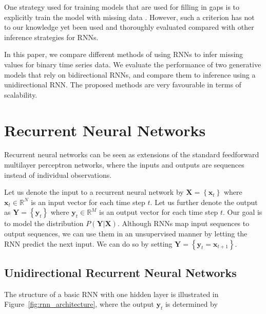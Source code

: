 \documentclass{article}
\begin{document}
One strategy used for training models that are used for filling in gaps is to 
explicitly train the model with missing data \citep[see e.g.][]{brakel2013training}.
However, such a criterion has not to our knowledge 
yet been used and thoroughly evaluated compared with other inference strategies 
for RNNs.

In this paper, we compare different methods of using RNNs to infer missing values 
for binary time series data. We evaluate the performance of two generative models that
rely on bidirectional RNNs, and compare them to inference using a unidirectional RNN.
The proposed methods are very favourable in terms of scalability.

\section{Recurrent Neural Networks}
\label{sec:rnns}

Recurrent neural networks \citep{rumelhart1986learning,haykin2009neural} can be seen as extensions of the standard feedforward 
multilayer perceptron networks, where the inputs and outputs are sequences 
instead of individual observations.

Let us denote the input to a recurrent neural network by $\mathbf{X} = 
\left\lbrace \mathbf{x}_t \right\rbrace$ where $\mathbf{x}_t \in \mathbb{R}^N$ 
is an input vector for each time step $t$. Let us further denote the output as 
$\mathbf{Y} = \left\lbrace \mathbf{y}_t \right\rbrace$ where $\mathbf{y}_t \in 
\mathbb{R}^M$ is an output vector for each time step $t$. Our goal is to model 
the distribution $P \left( \mathbf{Y} | \mathbf{X} \right)$. Although RNNs 
map input sequences to output sequences, we can use them in an unsupervised manner by letting 
the RNN predict the next input. We can do so by setting $\mathbf{Y} = 
\left\lbrace \mathbf{y}_t = \mathbf{x}_{t+1} \right\rbrace$.


\subsection{Unidirectional Recurrent Neural Networks}

The structure of a basic RNN with one hidden layer is  illustrated in 
Figure~\ref{fig:rnn_architecture}, where the output $\mathbf{y}_t$ is determined 
by
\end{document}
